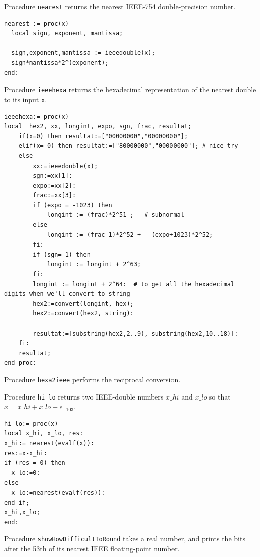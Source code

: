 Procedure \texttt{nearest} returns the nearest IEEE-754
double-precision number.

\begin{lstlisting}[caption={nearest},firstnumber=1]
nearest := proc(x)
  local sign, exponent, mantissa;

  sign,exponent,mantissa := ieeedouble(x);
  sign*mantissa*2^(exponent);
end:
\end{lstlisting}


Procedure \texttt{ieeehexa} returns the hexadecimal representation of the nearest double to its input \texttt{x}.

\begin{lstlisting}[caption={ieeehexa},firstnumber=1]
ieeehexa:= proc(x)
local  hex2, xx, longint, expo, sgn, frac, resultat;
    if(x=0) then resultat:=["00000000","00000000"];
    elif(x=-0) then resultat:=["80000000","00000000"]; # nice try
    else
        xx:=ieeedouble(x);
        sgn:=xx[1]:
        expo:=xx[2]:
        frac:=xx[3]:
        if (expo = -1023) then
            longint := (frac)*2^51 ;   # subnormal
        else
            longint := (frac-1)*2^52 +   (expo+1023)*2^52;
        fi:
        if (sgn=-1) then
            longint := longint + 2^63;
        fi:
        longint := longint + 2^64:  # to get all the hexadecimal digits when we'll convert to string
        hex2:=convert(longint, hex);
        hex2:=convert(hex2, string):

        resultat:=[substring(hex2,2..9), substring(hex2,10..18)]:
    fi:
    resultat;
end proc:
\end{lstlisting}

Procedure \texttt{hexa2ieee} performs the reciprocal conversion.





Procedure \texttt{hi\_lo} returns two IEEE-double numbers $x\_hi$ and
$x\_lo$ so that $x = x\_hi + x\_lo + \epsilon_{-103}$.

\begin{lstlisting}[caption={hi\_lo},firstnumber=1]
hi_lo:= proc(x)
local x_hi, x_lo, res:
x_hi:= nearest(evalf(x)):
res:=x-x_hi:
if (res = 0) then
  x_lo:=0:
else
  x_lo:=nearest(evalf(res)):
end if;
x_hi,x_lo;
end:
\end{lstlisting}
\vspace{0.5cm}




Procedure \texttt{showHowDifficultToRound} takes a real number, and prints
the bits after the 53th of its nearest IEEE floating-point number.


